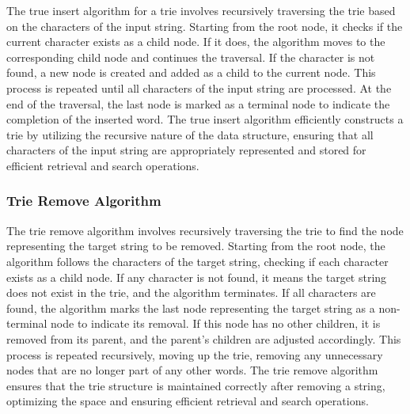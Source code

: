 The true insert algorithm for a trie involves recursively traversing the trie based on the characters of the input string. Starting from the root node, it checks if the current character exists as a child node. If it does, the algorithm moves to the corresponding child node and continues the traversal. If the character is not found, a new node 
is created and added as a child to the current node. This process is repeated until all characters of the input string are processed. At the end of the traversal, the last node is marked as a terminal node to indicate the completion of the inserted word. The true insert algorithm efficiently constructs a trie by utilizing the recursive nature 
of the data structure, ensuring that all characters of the input string are appropriately represented and stored for efficient retrieval and search operations.

\subsubsection{Trie Remove Algorithm}

The trie remove algorithm involves recursively traversing the trie to find the node representing the target string to be removed. Starting from the root node, the algorithm follows the characters of the target string, checking if each character exists as a child node. If any character is not found, it means the target string does not exist 
in the trie, and the algorithm terminates. If all characters are found, the algorithm marks the last node representing the target string as a non-terminal node to indicate its removal. If this node has no other children, it is removed from its parent, and the parent's children are adjusted accordingly. This process is repeated recursively, 
moving up the trie, removing any unnecessary nodes that are no longer part of any other words. The trie remove algorithm ensures that the trie structure is maintained correctly after removing a string, optimizing the space and ensuring efficient retrieval and search operations.

